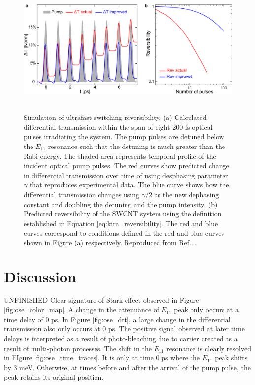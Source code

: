 \begin{figure}[ht]
	\centering
	\includegraphics[height=2.6in]{images/chapter_coherent/switching_reversibility}
	\caption{ Simulation of ultrafast switching reversibility. (a) Calculated differential transmission within the span of eight 200 fs optical pulses irradiating the system. The pump pulses are detuned below the $E_{11}$ resonance such that the detuning is much greater than the Rabi energy. The shaded area represents temporal profile of the incident optical pump pulses. The red curves show predicted change in differential transmission over time of using desphasing parameter $\gamma$ that reproduces experimental data. The blue curve shows how the differential transmission changes using $\gamma/2$ as the new dephasing constant and doubling the detuning and the pump intensity. (b) Predicted reversibility of the SWCNT system using the definition established in Equation \eqref{eq:kira_reversibility}. The red and blue curves correspond to conditions defined in the red and blue curves shown in Figure (a) respectively.  Reproduced from Ref.\ \cite{mack2019}.}
  \label{fig:ose_kira_simul}
\end{figure}



\clearpage

\section{Discussion}

{\color{red} UNFINISHED} Clear signature of Stark effect observed in Figure \ref{fig:ose_color_map}. A change in the attenuance of $E_{11}$ peak only occurs at a time delay of 0 ps. In Figure \ref{fig:ose_dtt}, a large change in the differential transmission also only occurs at 0 ps. The positive signal observed at later time delays is interpreted as a result of photo-bleaching due to carrier created as a result of multi-photon processes. The shift in the $E_{11}$ resonance is clearly resolved in FIgure \ref{fig:ose_time_traces}. It is only at time 0 ps where the $E_{11}$ peak shifts by 3 meV. Otherwise, at times before and after the arrival of the pump pulse, the peak retains its original position.


